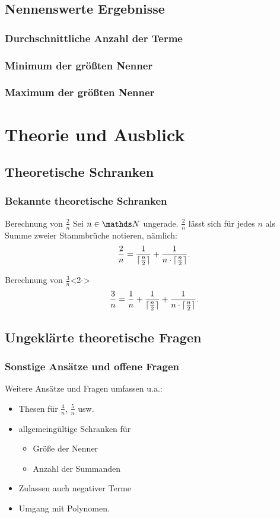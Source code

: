\documentclass{beamer}
\begin{document}
\subsection[Ergebnisse]{Nennenswerte Ergebnisse}
\begin{frame}
	\frametitle{Durchschnittliche Anzahl der Terme}
\end{frame}

\begin{frame}
\frametitle{Minimum der größten Nenner}
\end{frame}

\begin{frame}
\frametitle{Maximum der größten Nenner}
\end{frame}

\section{Theorie und Ausblick}
\subsection{Theoretische Schranken}

\begin{frame}
	\frametitle{Bekannte theoretische Schranken}
	\begin{block}{Berechnung von $\frac{2}{n}$}
	Sei $n \in \N$ ungerade. $\frac{2}{n}$ lässt sich für jedes $n$ als Summe zweier Stammbrüche notieren, nämlich:
	$$\frac{2}{n} = \frac{1}{\lceil \frac{n}{2} \rceil} + \frac{1}{n \cdot \lceil \frac{n}{2} \rceil}.$$
	\end{block}
	\begin{block}{Berechnung von $\frac{3}{n}$}<2->
		$$\frac{3}{n} = \frac{1}{n} + \frac{1}{\lceil \frac{n}{2} \rceil} + \frac{1}{n \cdot \lceil \frac{n}{2} \rceil}.$$
	\end{block}
\end{frame}

\subsection{Ungeklärte theoretische Fragen}

\begin{frame}
	\frametitle{Sonstige Ansätze und offene Fragen}
	Weitere Ansätze und Fragen umfassen u.a.:
	\begin{itemize}
		\item Thesen für $\frac{4}{n}$, $\frac{5}{n}$ usw.
		\item allgemeingültige Schranken für
		\begin{itemize}
			\item Größe der Nenner
			\item Anzahl der Summanden
		\end{itemize}
		\item Zulassen auch negativer Terme
		\item Umgang mit Polynomen.
	\end{itemize}
\end{frame}
\end{document}
